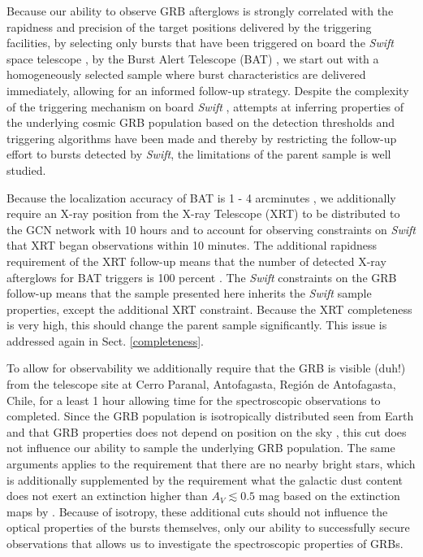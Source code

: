 \documentclass{aa}    %
\begin{document}
Because our ability to observe GRB afterglows is strongly correlated with the
rapidness and precision of the target positions delivered by the triggering
facilities, by selecting only bursts that have been triggered on board the
\textit{Swift} space telescope \cite{Gehrels2004}, by the Burst Alert Telescope
(BAT) \citep{Barthelmy2005}, we start out with a homogeneously selected sample
where burst characteristics are delivered immediately, allowing for an informed
follow-up strategy. Despite the complexity of the triggering mechanism on board
\textit{Swift} \citep{Band2006}, attempts at inferring properties of the
underlying cosmic GRB population based on the detection thresholds and
triggering algorithms have been made \citep{Lien2014, Graff2016} and thereby by
restricting the follow-up effort to bursts detected by \textit{Swift}, the
limitations of the parent sample is well studied.

Because the localization accuracy of BAT is 1 - 4 arcminutes
\citep{Barthelmy2005}, we additionally require an X-ray position from the X-ray
Telescope (XRT) \citep{Burrows2005} to be distributed to the GCN network
\citep{Barthelmy2000} with 10 hours and to account for observing constraints on
\textit{Swift} that XRT began observations within 10 minutes. The additional
rapidness requirement of the XRT follow-up means that the number of detected
X-ray afterglows for BAT triggers is 100 percent \citep{Burrows2007}. The
\textit{Swift} constraints on the GRB follow-up means that the sample presented
here inherits the \textit{Swift} sample properties, except the additional XRT
constraint. Because the XRT completeness is very high\citep{Burrows2007}, this
should change the parent sample significantly. This issue is addressed again in
Sect. \ref{completeness}.

To allow for observability we additionally require that the GRB is visible
(duh!) from the telescope site at Cerro Paranal, Antofagasta, Región de
Antofagasta, Chile, for a least 1 hour allowing time for the spectroscopic
observations to completed. Since the GRB population is isotropically distributed
seen from Earth and that GRB properties does not depend on position on the sky
\citep{Briggs1996}, this cut does not influence our ability to sample the
underlying GRB population. The same arguments applies to the requirement that
there are no nearby bright stars, which is additionally supplemented by the
requirement what the galactic dust content does not exert an extinction higher
than $A_V \lesssim 0.5$ mag based on the extinction maps by
\citet{Schlegel1998}. Because of  isotropy, these additional cuts should not
influence the optical properties of the bursts themselves, only our ability to
successfully secure observations that allows us to investigate the spectroscopic
properties of GRBs.
\end{document}
